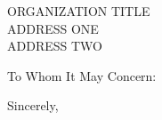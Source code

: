 \documentclass[11pt]{letter}
\makeatletter
\renewcommand{\closing}[1]{\par\nobreak\vspace{\parskip}%
	\stopbreaks
	\noindent
	\ifx\@empty\fromaddress\else
	\hspace*{\longindentation}\fi
	\parbox{\indentedwidth}{\raggedright
		\ignorespaces #1\\[\medskipamount]%
		\ifx\@empty\fromsig
		\fromname
		\else \fromsig \fi\strut}%
	\par}
\makeatother
\begin{document}
	
	\date{\today}
	
	\begin{letter}{ORGANIZATION TITLE \\ ADDRESS ONE \\ ADDRESS TWO}
		
		\opening{To Whom It May Concern:}
		
		\lipsum[1-2]
		
		\closing{Sincerely,}
		
	\end{letter}
\end{document}

